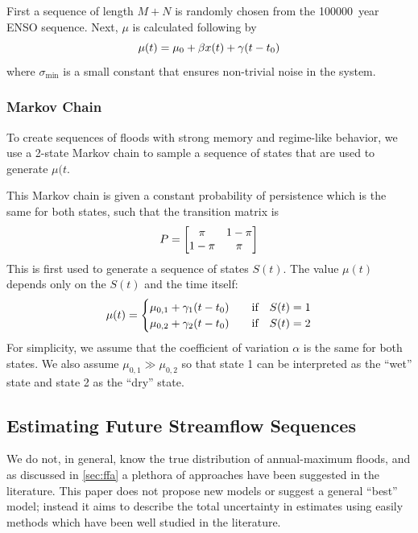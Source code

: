 \documentclass[12pt]{article}
\begin{document}
First a sequence of length \(M+N\) is randomly chosen from the \SI{100000}{year} ENSO sequence.
Next, \(\mu\) is calculated following by
\begin{equation}
  \mu(t) = \mu_0 + \beta x(t) + \gamma \qty(t - t_0)
\end{equation}
where \(\sigma_\text{min}\) is a small constant that ensures non-trivial noise in the system.

\subsubsection{Markov Chain\label{sec:methods-markov}}

To create sequences of floods with strong memory and regime-like behavior, we use a 2-state Markov chain to sample a sequence of states that are used to generate \(\mu(t\).

This Markov chain is given a constant probability of persistence which is the same for both states, such that the transition matrix is
\begin{equation*}
  P = \mqty[\pi & 1-\pi \\ 1-\pi & \pi]
\end{equation*}
This is first used to generate a sequence of states \(S(t)\).
The value \( \mu(t) \) depends only on the \(S(t)\) and the time itself:
\begin{equation*}
  \mu(t) = \begin{cases}
    \mu_{0,1} + \gamma_1 \qty(t - t_0) & \qqtext{if} S(t) = 1 \\
    \mu_{0,2} + \gamma_2 \qty(t - t_0) & \qqtext{if} S(t) = 2
  \end{cases}
\end{equation*}
For simplicity, we assume that the coefficient of variation \( \alpha \) is the same for both states.
We also assume \( \mu_{0, 1} \gg \mu_{0, 2} \) so that state 1 can be interpreted as the ``wet'' state and state 2 as the ``dry'' state.

\subsection{Estimating Future Streamflow Sequences\label{sec:estimation}}

We do not, in general, know the true distribution of annual-maximum floods, and as discussed in \cref{sec:ffa} a plethora of approaches have been suggested in the literature.
This paper does not propose new models or suggest a general ``best'' model; instead it aims to describe the total uncertainty in estimates using easily methods which have been well studied in the literature.
\end{document}
